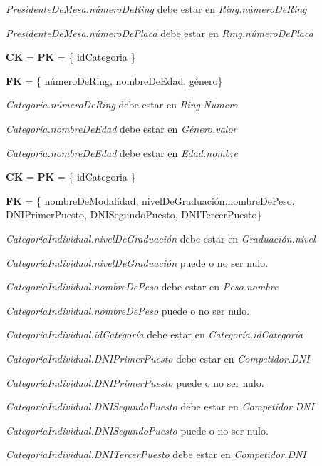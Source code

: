 \textit{PresidenteDeMesa.númeroDeRing} debe estar en \textit{Ring.númeroDeRing}

\textit{PresidenteDeMesa.númeroDePlaca} debe estar en \textit{Ring.númeroDePlaca}\\


\textbf{CK} = \textbf{PK} = \{ idCategoria \}

\textbf{FK} = \{ númeroDeRing, nombreDeEdad, género\}

\textit{Categoría.númeroDeRing} debe estar en \textit{Ring.Numero}

\textit{Categoría.nombreDeEdad} debe estar en \textit{Género.valor}

\textit{Categoría.nombreDeEdad} debe estar en \textit{Edad.nombre}\\


\textbf{CK} = \textbf{PK} = \{ idCategoria \}

\textbf{FK} = \{ nombreDeModalidad, nivelDeGraduación,nombreDePeso, DNIPrimerPuesto, DNISegundoPuesto, DNITercerPuesto\}


\textit{CategoríaIndividual.nivelDeGraduación} debe estar en \textit{Graduación.nivel}

\textit{CategoríaIndividual.nivelDeGraduación} puede o no ser nulo.

\textit{CategoríaIndividual.nombreDePeso} debe estar en \textit{Peso.nombre}

\textit{CategoríaIndividual.nombreDePeso} puede o no ser nulo. 

\textit{CategoríaIndividual.idCategoría} debe estar en \textit{Categoría.idCategoría}

\textit{CategoríaIndividual.DNIPrimerPuesto} debe estar en \textit{Competidor.DNI}

\textit{CategoríaIndividual.DNIPrimerPuesto} puede o no ser nulo.

\textit{CategoríaIndividual.DNISegundoPuesto} debe estar en \textit{Competidor.DNI}

\textit{CategoríaIndividual.DNISegundoPuesto} puede o no ser nulo.

\textit{CategoríaIndividual.DNITercerPuesto} debe estar en \textit{Competidor.DNI}

